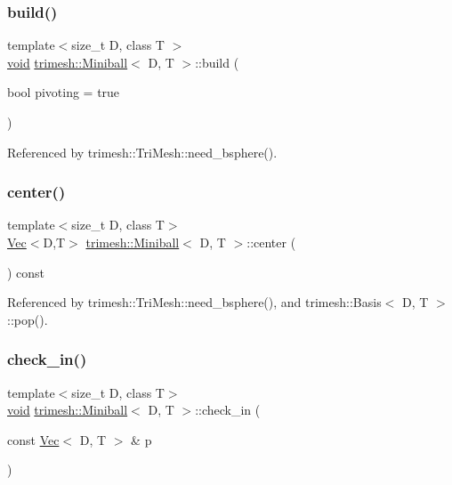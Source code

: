 \subsubsection{\texorpdfstring{build()}{build()}}
{\footnotesize\ttfamily template$<$size\+\_\+t D, class T $>$ \\
\hyperlink{namespacetrimesh_a784ddfd979e1c579bda795a8edfc3f43}{void} \hyperlink{classtrimesh_1_1Miniball}{trimesh\+::\+Miniball}$<$ D, T $>$\+::build (\begin{DoxyParamCaption}\item[{bool}]{pivoting = {\ttfamily true} }\end{DoxyParamCaption})}



Referenced by trimesh\+::\+Tri\+Mesh\+::need\+\_\+bsphere().

\mbox{\label{classtrimesh_1_1Miniball_a478104adc53e913dc98079b3c00777c7}} 
\subsubsection{\texorpdfstring{center()}{center()}}
{\footnotesize\ttfamily template$<$size\+\_\+t D, class T$>$ \\
\hyperlink{classtrimesh_1_1Vec}{Vec}$<$D,T$>$ \hyperlink{classtrimesh_1_1Miniball}{trimesh\+::\+Miniball}$<$ D, T $>$\+::center (\begin{DoxyParamCaption}{ }\end{DoxyParamCaption}) const\hspace{0.3cm}{\ttfamily [inline]}}



Referenced by trimesh\+::\+Tri\+Mesh\+::need\+\_\+bsphere(), and trimesh\+::\+Basis$<$ D, T $>$\+::pop().

\mbox{\label{classtrimesh_1_1Miniball_a0ee2a2ebd9f7ae4aa244c3cb6107f918}} 
\subsubsection{\texorpdfstring{check\+\_\+in()}{check\_in()}\hspace{0.1cm}{\footnotesize\ttfamily [1/2]}}
{\footnotesize\ttfamily template$<$size\+\_\+t D, class T$>$ \\
\hyperlink{namespacetrimesh_a784ddfd979e1c579bda795a8edfc3f43}{void} \hyperlink{classtrimesh_1_1Miniball}{trimesh\+::\+Miniball}$<$ D, T $>$\+::check\+\_\+in (\begin{DoxyParamCaption}\item[{const \hyperlink{classtrimesh_1_1Vec}{Vec}$<$ D, T $>$ \&}]{p }\end{DoxyParamCaption})\hspace{0.3cm}{\ttfamily [inline]}}



